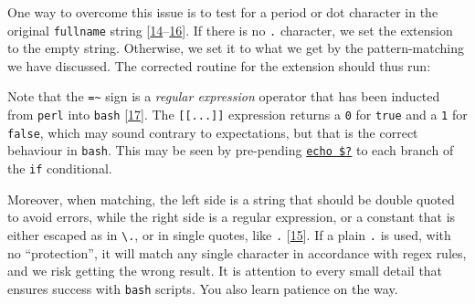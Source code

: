 \documentclass[
  a4paper,
]{article}
\newenvironment{Shaded}{\begin{snugshade}}{\end{snugshade}}
\newcommand{\AttributeTok}[1]{\textcolor[rgb]{0.80,0.80,0.80}{#1}}
\newcommand{\BuiltInTok}[1]{\textcolor[rgb]{0.80,0.80,0.80}{#1}}
\newcommand{\CommentTok}[1]{\textcolor[rgb]{0.50,0.62,0.50}{#1}}
\newcommand{\ControlFlowTok}[1]{\textcolor[rgb]{0.94,0.87,0.69}{#1}}
\newcommand{\DataTypeTok}[1]{\textcolor[rgb]{0.87,0.87,0.75}{#1}}
\newcommand{\KeywordTok}[1]{\textcolor[rgb]{0.94,0.87,0.69}{#1}}
\newcommand{\NormalTok}[1]{\textcolor[rgb]{0.80,0.80,0.80}{#1}}
\newcommand{\OperatorTok}[1]{\textcolor[rgb]{0.94,0.94,0.82}{#1}}
\newcommand{\OtherTok}[1]{\textcolor[rgb]{0.94,0.94,0.56}{#1}}
\newcommand{\PreprocessorTok}[1]{\textcolor[rgb]{1.00,0.81,0.69}{\textbf{#1}}}
\newcommand{\StringTok}[1]{\textcolor[rgb]{0.80,0.58,0.58}{#1}}
\newcommand{\VariableTok}[1]{\textcolor[rgb]{0.80,0.80,0.80}{#1}}
\begin{document}
One way to overcome this issue is to test for a period or dot character
in the original \texttt{fullname} string
{[}\protect\hyperlink{ref-periodtest}{14}--\protect\hyperlink{ref-bashscriptpatmatch}{16}{]}.
If there is no \texttt{.} character, we set the extension to the empty
string. Otherwise, we set it to what we get by the pattern-matching we
have discussed. The corrected routine for the extension should thus run:

\begin{Shaded}
\end{Shaded}

Note that the \texttt{=\textasciitilde{}} sign is a \emph{regular
expression} operator that has been inducted from \texttt{perl} into
\texttt{bash} {[}\protect\hyperlink{ref-equaltilde}{17}{]}. The
\texttt{{[}{[}...{]}{]}} expression returns a \texttt{0} for
\texttt{true} and a \texttt{1} for \texttt{false}, which may sound
contrary to expectations, but that is the correct behaviour in
\texttt{bash}. This may be seen by pre-pending
\href{https://stackoverflow.com/questions/6834487/what-is-the-dollar-question-mark-variable-in-shell-scripting}{\texttt{echo\ \$?}}
to each branch of the \texttt{if} conditional.

Moreover, when matching, the left side is a string that should be double
quoted to avoid errors, while the right side is a regular expression, or
a constant that is either escaped as in \texttt{\textbackslash{}.}, or
in single quotes, like \texttt{\textquotesingle{}.\textquotesingle{}}
{[}\protect\hyperlink{ref-dottest}{15}{]}. If a plain \texttt{.} is
used, with no ``protection'', it will match any single character in
accordance with regex rules, and we risk getting the wrong result. It is
attention to every small detail that ensures success with \texttt{bash}
scripts. You also learn patience on the way.  \normalfont
\end{document}
